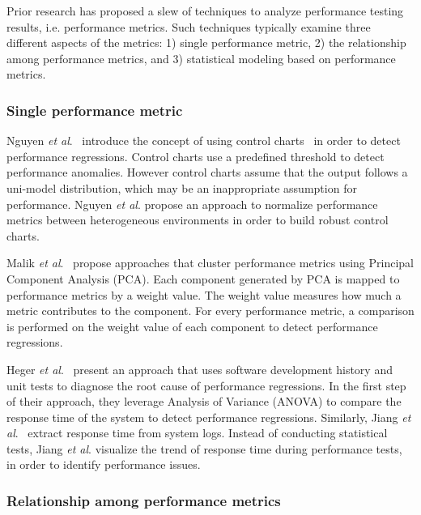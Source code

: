 \documentclass[smallextended]{svjour3}       %
\begin{document}
Prior research has proposed a slew of techniques to analyze performance testing results, i.e. performance metrics. Such techniques typically examine three different aspects of the metrics: 1) single performance metric, 2) the relationship among performance metrics, and 3) statistical modeling based on performance metrics.


\subsubsection{Single performance metric}
\label{sec:relatedindividual}
Nguyen \textit{et al$.$}~\cite{Nguyen:2012:ADP:2188286.2188344} introduce the concept of using control charts~\cite{shewhart1931economic} in order to detect performance regressions. Control charts use a predefined threshold to detect performance anomalies. However control charts assume that the output follows a uni-model distribution, which may be an inappropriate assumption for performance. Nguyen \textit{ et al$.$} propose an approach to normalize performance metrics between heterogeneous environments in order to build robust control charts. %

Malik \emph{et al$.$}~\cite{Malik:2010:ACL:1955601.1955936, haroon} propose approaches that cluster performance metrics using Principal Component Analysis (PCA). Each component generated by PCA is mapped to performance metrics by a weight value. The weight value measures how much a metric contributes to the component. For every performance metric, a comparison is performed on the weight value of each component to detect performance regressions.

Heger \emph{et al$.$}~\cite{DBLP:conf/wosp/HegerHF13} present an approach that uses software development history and unit tests to diagnose the root cause of performance regressions. In the first step of their approach, they leverage Analysis of Variance (ANOVA) to compare the response time of the system to detect performance regressions. Similarly, Jiang \emph{et al$.$}~\cite{jackicsm2009} extract response time from system logs. Instead of conducting statistical tests, Jiang \emph{et al$.$} visualize the trend of response time during performance tests, in order to identify performance issues.


\subsubsection{Relationship among performance metrics}
\label{sec:relatedrelation}
\end{document}
